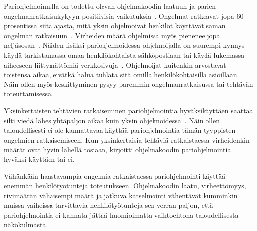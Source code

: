 \documentclass[finnish]{tktltiki2}
\theoremstyle{definition}
\theoremstyle{remark}
\begin{document}
Pariohjelmoinnilla on todettu olevan ohjelmakoodin laatuun ja parien ongelmanratkaisukykyyn positiivisia vaikutuksia~\cite{pairprogramming}. Ongelmat ratkeavat jopa 60 prosentissa siitä ajasta, mitä yksin ohjelmoivat henkilöt käyttävät saman ongelman ratkaisuun~\cite{meta}. Virheiden määrä ohjelmissa myös pienenee jopa neljäsosan~\cite{williams00str}. Näiden lisäksi pariohjelmoidessa ohjelmoijalla on suurempi kynnys käydä tarkistamassa omaa henkilökohtaista sähköpostiaan tai käydä lukemassa aiheeseen liittymättömiä verkkosivuja~\cite{williams03pair}. Ohjelmoijat kuitenkin arvostavat toistensa aikaa, eivätkä halua tuhlata sitä omilla henkilökohtaisilla asioillaan. Näin ollen myös keskittyminen pysyy paremmin ongelmanratkaisussa tai tehtävän toteuttamisessa.

Yksinkertaisten tehtävien ratkaiseminen pariohjelmointia hyväksikäyttäen saattaa silti viedä lähes yhtäpaljon aikaa kuin yksin ohjelmoidessa~\cite{meta}. Näin ollen taloudellisesti ei ole kannattavaa käyttää pariohjelmointia tämän tyyppisten ongelmien ratkaisemiseen. Kun yksinkertaisia tehtäviä ratkaistaessa virheidenkin määrät ovat hyvin lähellä tosiaan, kirjoitti ohjelmakoodin pariohjelmointia hyväksi käyttäen tai ei.

Vähänkään haastavampia ongelmia ratkaistaessa pariohjelmointi käyttää enemmän henkilötyötunteja toteutukseen. Ohjelmakoodin laatu, virheettömyys, rivimäärän vähäisempi määrä ja jatkuva katselmointi vähentävät kumminkin muissa vaiheissa tarvittavia henkilötyötunteja sen verran paljon, että pariohjelmointia ei kannata jättää huomioimatta vaihtoehtona taloudellisesta näkökulmasta.


%
%
% 
%



\end{document}
